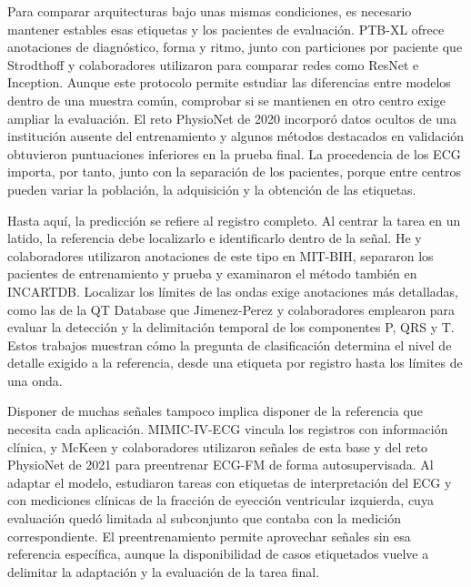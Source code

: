 Para comparar arquitecturas bajo unas mismas condiciones, es necesario mantener estables esas etiquetas y los pacientes de evaluación. PTB-XL ofrece anotaciones de diagnóstico, forma y ritmo, junto con particiones por paciente que Strodthoff y colaboradores utilizaron para comparar redes como ResNet e Inception. Aunque este protocolo permite estudiar las diferencias entre modelos dentro de una muestra común, comprobar si se mantienen en otro centro exige ampliar la evaluación. El reto PhysioNet de 2020 incorporó datos ocultos de una institución ausente del entrenamiento y algunos métodos destacados en validación obtuvieron puntuaciones inferiores en la prueba final. La procedencia de los ECG importa, por tanto, junto con la separación de los pacientes, porque entre centros pueden variar la población, la adquisición y la obtención de las etiquetas. \cite{wagner2020,strodthoff2021ptbxl,perezalday2020challenge}

Hasta aquí, la predicción se refiere al registro completo. Al centrar la tarea en un latido, la referencia debe localizarlo e identificarlo dentro de la señal. He y colaboradores utilizaron anotaciones de este tipo en MIT-BIH, separaron los pacientes de entrenamiento y prueba y examinaron el método también en INCARTDB. Localizar los límites de las ondas exige anotaciones más detalladas, como las de la QT Database que Jimenez-Perez y colaboradores emplearon para evaluar la detección y la delimitación temporal de los componentes P, QRS y T. Estos trabajos muestran cómo la pregunta de clasificación determina el nivel de detalle exigido a la referencia, desde una etiqueta por registro hasta los límites de una onda. \cite{mitbih,incartdb,he2018pyramid,qtdb,jimenezperez2021delineation}

Disponer de muchas señales tampoco implica disponer de la referencia que necesita cada aplicación. MIMIC-IV-ECG vincula los registros con información clínica, y McKeen y colaboradores utilizaron señales de esta base y del reto PhysioNet de 2021 para preentrenar ECG-FM de forma autosupervisada. Al adaptar el modelo, estudiaron tareas con etiquetas de interpretación del ECG y con mediciones clínicas de la fracción de eyección ventricular izquierda, cuya evaluación quedó limitada al subconjunto que contaba con la medición correspondiente. El preentrenamiento permite aprovechar señales sin esa referencia específica, aunque la disponibilidad de casos etiquetados vuelve a delimitar la adaptación y la evaluación de la tarea final. \cite{gow2023mimicecg,reyna2022challenge,mckeen2025ecgfm}

